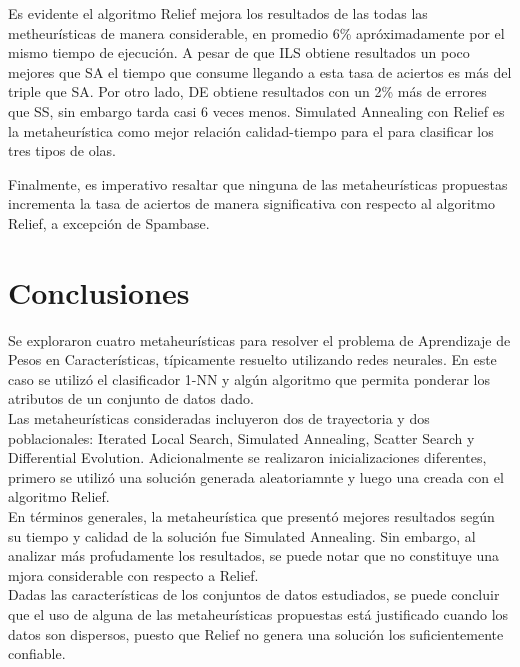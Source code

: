 \documentclass{ci5652}
\begin{document}
Es evidente el algoritmo Relief mejora los resultados de las todas las metheurísticas de manera considerable, en promedio 6\% apróximadamente por el mismo tiempo de ejecución. A pesar de que ILS obtiene resultados un poco mejores que SA el tiempo que consume llegando a esta tasa de aciertos es más del triple que SA. Por otro lado, DE obtiene resultados con un 2\% más de errores que SS, sin embargo tarda casi 6 veces menos. Simulated Annealing con Relief es la metaheurística como mejor relación calidad-tiempo para el para clasificar los tres tipos de olas.

Finalmente, es imperativo resaltar que ninguna de las metaheurísticas propuestas incrementa la tasa de aciertos de manera significativa con respecto al algoritmo Relief, a excepción de Spambase.


\section*{Conclusiones}

Se exploraron cuatro metaheurísticas para resolver el problema de Aprendizaje de Pesos en Características, típicamente resuelto utilizando redes neurales. En este caso se utilizó el clasificador 1-NN y algún algoritmo que permita ponderar los atributos de un conjunto de datos dado.\\

Las metaheurísticas consideradas incluyeron dos de trayectoria y dos poblacionales: Iterated Local Search, Simulated Annealing, Scatter Search y Differential Evolution. Adicionalmente se realizaron inicializaciones diferentes, primero se utilizó una solución generada aleatoriamnte y luego una creada con el algoritmo Relief.\\

En términos generales, la metaheurística que presentó mejores resultados según su tiempo y calidad de la solución fue Simulated Annealing. Sin embargo, al analizar más profudamente los resultados, se puede notar que no constituye una mjora considerable con respecto a Relief.\\

Dadas las características de los conjuntos de datos estudiados, se puede concluir que el uso de alguna de las metaheurísticas propuestas está justificado cuando los datos son dispersos, puesto que Relief no genera una solución los suficientemente confiable.\\
\end{document}
